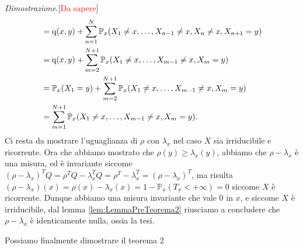 \documentclass[11pt]{book}
\makeatletter
\theoremstyle{Definizione}
\theoremstyle{TeoremaProposizioneLemmaCorollario}
\theoremstyle{OsservazioneNota}
\renewenvironment{proof}[1][\proofname]{\par
  \normalfont \topsep6\p@\@plus6\p@\relax
  \trivlist
  \item[\hskip\labelsep
        \itshape
    #1\@addpunct{.}]\ignorespaces
}{%
  \endtrivlist\@endpefalse
}
\renewcommand{\P}{\mathbb{P}}
\newcommand{\q}{\textup{q}}
\renewenvironment{proof}{\textsl{Dimostrazione}.}{}
\makeatother
\begin{document}
\begin{boxpro}
\begin{proof}[\textcolor{red}{Da sapere}]
\begin{align*}
&= \q(x,y) + \sum_{n = 1}^N \P_x(X_1 \neq x,\dots,X_{n-1} \neq x, X_n \neq x, X_{n+1} = y)\\
&= \q(x,y) + \sum_{m = 2}^{N+1} \P_x(X_1 \neq x,\dots,X_{m-1}\neq x, X_m = y)\\
&= \P_x(X_1 = y) + \sum_{m = 2}^{N+1} \P_x(X_1 \neq x,\dots,X_{m-1}\neq x, X_m = y)\\
&= \sum_{m = 1}^{N+1} \P_x(X_1 \neq x,\dots,X_{m-1}\neq x, X_m = y).
\end{align*}
Ci resta da mostrare l'uguaglianza di $\rho$ con $\lambda_x$ nel caso $X$ sia irriducibile e ricorrente. Ora che abbiamo mostrato che $\rho(y) \geq \lambda_x(y)$, abbiamo che $\rho-\lambda_x$ è una misura, ed è invariante siccome $(\rho-\lambda_x)^TQ = \rho^T Q - \lambda_x^TQ = \rho^T-\lambda_x^T = (\rho-\lambda_x)^T$, ma risulta $(\rho-\lambda_x)(x) = \rho(x)-\lambda_x(x) = 1-\P_x(T_x <+\infty) = 0$ siccome $X$ è ricorrente. Dunque abbiamo una misura invariante che vale $0$ in $x$, e siccome $X$ è irriducibile, dal lemma \ref{lem:LemmaPreTeorema2} riusciamo a concludere che $\rho-\lambda_x$ è identicamente nulla, ossia la tesi.
\end{proof}
\end{boxpro}
\noindent
Possiamo finalmente dimostrare il teorema 2
\end{document}
